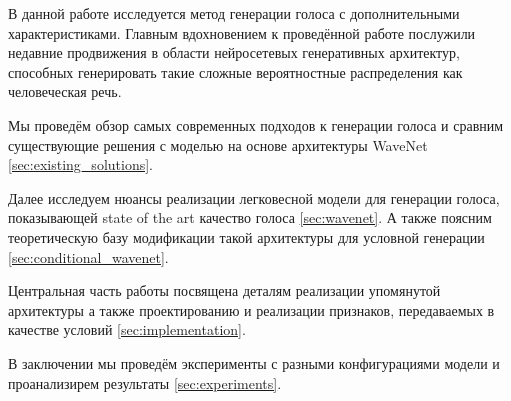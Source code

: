 
% 
        
    \label{sections/introduction}
    
    В данной работе исследуется метод генерации голоса с дополнительными характеристиками.
    Главным вдохновением к проведённой работе послужили недавние продвижения в области нейросетевых  генеративных архитектур, способных генерировать такие сложные вероятностные распределения как человеческая речь\cite{article:van2016wavenet}.
    
    Мы проведём обзор самых современных подходов к генерации голоса и сравним существующие решения с моделью на основе архитектуры WaveNet \ref{sec:existing_solutions}.
    
    Далее исследуем нюансы реализации легковесной модели для генерации голоса, показывающей state of the art качество голоса \ref{sec:wavenet}. А также поясним теоретическую базу модификации такой архитектуры для условной генерации \ref{sec:conditional_wavenet}. 
    
    Центральная часть работы посвящена деталям реализации упомянутой архитектуры а также проектированию и реализации признаков, передаваемых в качестве условий \ref{sec:implementation}.
    
    В заключении мы проведём эксперименты с разными конфигурациями модели и проанализирем результаты \ref{sec:experiments}.

% 

